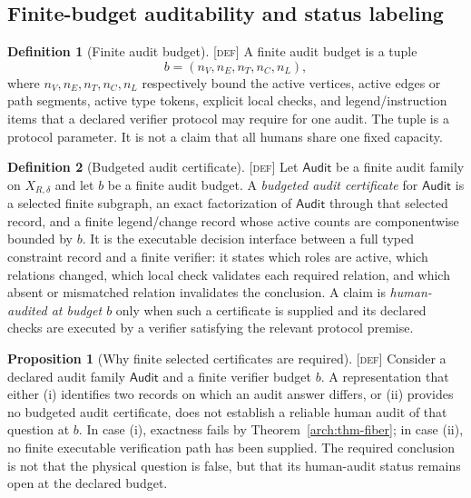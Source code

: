 \documentclass[11pt]{article}
\newcommand{\Audit}{\ensuremath{\mathsf{Audit}}}
\newcommand{\Defn}{\textsc{[def]}}
\theoremstyle{definition}
\newtheorem{sdefinition}{Definition}
\newtheorem{sproposition}{Proposition}
\begin{document}
\subsection{Finite-budget auditability and status labeling}

\begin{sdefinition}[Finite audit budget]
\label{arch:def-audit-budget}
\Defn{} A finite audit budget is a tuple
\begin{equation}
 b=(n_V,n_E,n_T,n_C,n_L),
\label{arch:eq-audit-budget}
\end{equation}
where $n_V,n_E,n_T,n_C,n_L$ respectively bound the active vertices, active edges or
path segments, active type tokens, explicit local checks, and legend/instruction
items that a declared verifier protocol may require for one audit. The tuple is a
protocol parameter. It is not a claim that all humans share one fixed capacity.
\end{sdefinition}

\begin{sdefinition}[Budgeted audit certificate]
\label{arch:def-budgeted-certificate}
\Defn{} Let $\Audit$ be a finite audit family on $X_{R,\delta}$ and let $b$ be a
finite audit budget. A \emph{budgeted audit certificate} for $\Audit$ is a selected
finite subgraph, an exact factorization of $\Audit$ through that selected record,
and a finite legend/change record whose active counts are componentwise bounded by
$b$. It is the executable decision interface between a full typed constraint record
and a finite verifier: it states which roles are active, which relations changed,
which local check validates each required relation, and which absent or mismatched
relation invalidates the conclusion. A claim is \emph{human-audited at budget $b$}
only when such a certificate is supplied and its declared checks are executed by a
verifier satisfying the relevant protocol premise.
\end{sdefinition}

\begin{sproposition}[Why finite selected certificates are required]
\label{arch:prop-budgeted-need}
\Defn{} Consider a declared audit family $\Audit$ and a finite verifier budget $b$.
A representation that either (i) identifies two records on which an audit answer
differs, or (ii) provides no budgeted audit certificate, does not establish a
reliable human audit of that question at $b$. In case (i), exactness fails by
Theorem~\ref{arch:thm-fiber}; in case (ii), no finite executable verification path
has been supplied. The required conclusion is not that the physical question is
false, but that its human-audit status remains open at the declared budget.
\end{sproposition}
\end{document}
